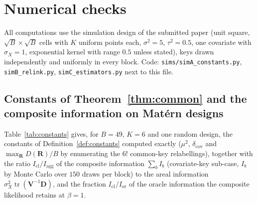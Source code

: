 \documentclass[11pt]{article}
\theoremstyle{definition}
\newcommand{\bV}{\mathbf{V}}
\newcommand{\bD}{\mathbf{D}}
\newcommand{\bR}{\mathbf{R}}
\newcommand{\tr}{\operatorname{tr}}
\newcommand{\agg}{\mathrm{agg}}
\newcommand{\orc}{\mathrm{or}}
\begin{document}
\section{Numerical checks}\label{sec:numerics}

All computations use the simulation design of the submitted paper (unit square, $\sqrt B\times\sqrt B$ cells with $K$ uniform points each, $\sigma^2=5$, $\tau^2=0.5$, one covariate with $\sigma_X=1$, exponential kernel with range $0.5$ unless stated), keys drawn independently and uniformly in every block. Code: \texttt{sims/simA\_constants.py}, \texttt{simB\_relink.py}, \texttt{simC\_estimators.py} next to this file.

\subsection{Constants of Theorem~\ref{thm:common} and the composite information on Mat\'ern designs}
Table~\ref{tab:constants} gives, for $B=49$, $K=6$ and one random design, the constants of Definition~\ref{def:constants} computed exactly ($\mu^2$, $\delta_{\mathrm{cov}}$ and $\max_{\bR}D(\bR)/B$ by enumerating the $6!$ common-key relabellings), together with the ratio $I_{\mathrm{cl}}/I_\agg$ of the composite information $\sum_bI_b$ (covariate-key sub-case, $I_b$ by Monte Carlo over $150$ draws per block) to the areal information $\sigma_X^2\tr(\bV^{-1}\bD)$, and the fraction $I_{\mathrm{cl}}/I_\orc$ of the oracle information the composite likelihood retains at $\beta=1$.
\end{document}
